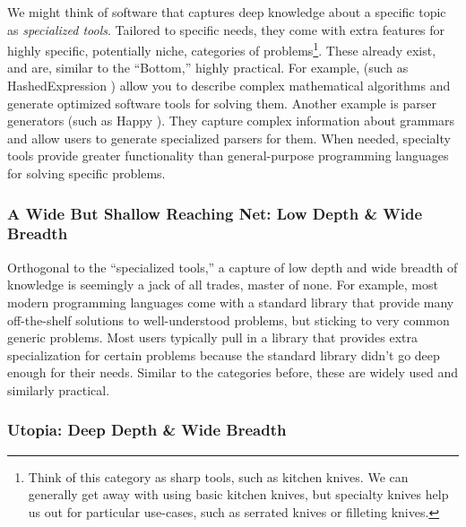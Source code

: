 We might think of software that captures deep knowledge about a specific topic
as \textit{specialized tools}. Tailored to specific needs, they come with extra
features for highly specific, potentially niche, categories of
problems\footnote{Think of this category as sharp tools, such as kitchen knives.
We can generally get away with using basic kitchen knives, but specialty knives
help us out for particular use-cases, such as serrated knives or filleting
knives.}. These already exist, and are, similar to the ``Bottom,'' highly
practical. For example,  (such as HashedExpression
\cite{HashedExpression}) allow you to describe complex mathematical algorithms
and generate optimized software tools for solving them. Another example is
parser generators (such as Happy \cite{Happy}). They capture complex information
about grammars and allow users to generate specialized parsers for them. When
needed, specialty tools provide greater functionality than general-purpose
programming languages for solving specific problems.

\subsubsection{A Wide But Shallow Reaching Net: Low Depth \& Wide Breadth}
\label{chap:ideology:sec:thoughts_of_generation:subsec:feasibility:subsubsec:modelling}

Orthogonal to the ``specialized tools,'' a capture of low depth and wide breadth
of knowledge is seemingly a jack of all trades, master of none. For example,
most modern programming languages come with a standard library that provide many
off-the-shelf solutions to well-understood problems, but sticking to very common
generic problems. Most users typically pull in a library that provides extra
specialization for certain problems because the standard library didn't go deep
enough for their needs. Similar to the categories before, these are widely used
and similarly practical.

\subsubsection{Utopia: Deep Depth \& Wide Breadth}
\label{chap:ideology:sec:thoughts_of_generation:subsec:feasibility:subsubsec:utopia}

